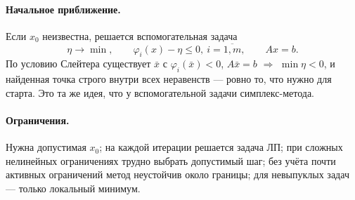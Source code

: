 \paragraph{Начальное приближение.}
Если $x_0$ неизвестна, решается вспомогательная задача
\[
  \eta \to \min , \qquad \varphi_i(x) - \eta \le 0,\ i = \overline{1,m},
  \qquad Ax = b .
\]
По условию Слейтера существует $\bar{x}$ с $\varphi_i(\bar{x}) < 0$,
$A\bar{x} = b$ $\Rightarrow$ $\min\eta < 0$, и найденная точка строго внутри
всех неравенств — ровно то, что нужно для старта. Это та же идея, что у
вспомогательной задачи симплекс-метода.

\paragraph{Ограничения.}
Нужна допустимая $x_0$; на каждой итерации решается задача ЛП; при сложных
нелинейных ограничениях трудно выбрать допустимый шаг; без учёта почти
активных ограничений метод неустойчив около границы; для невыпуклых задач —
только локальный минимум.


